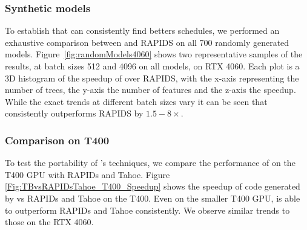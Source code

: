 \subsubsection*{Synthetic models}
To establish that \Treebeard{} can consistently find betters schedules, we performed an exhaustive comparison between \Treebeard{} and RAPIDS on all 700 randomly generated models.   
Figure~\ref{fig:randomModels4060} shows two representative samples of the results, at batch sizes 512 and 4096 on all models, on RTX 4060. 
Each plot is a 3D histogram of the speedup of \Treebeard{} over RAPIDS, with the x-axis representing the number of trees, the y-axis the number of features and the z-axis the speedup. 
While the exact trends at different batch sizes vary it can be seen that \Treebeard{} consistently outperforms RAPIDS by $1.5-8\times$. 
\subsubsection*{Comparison on T400}
To test the portability of \Treebeard{}'s techniques, we compare the performance 
of \Treebeard{} on the T400 GPU with RAPIDs and Tahoe. Figure \ref{Fig:TBvsRAPIDsTahoe_T400_Speedup}
shows the speedup of code generated by \Treebeard{} vs RAPIDs and Tahoe on the T400.
Even on the smaller T400 GPU, \Treebeard{} is able to outperform RAPIDs
and Tahoe consistently. We observe similar trends to those on the RTX 4060.

